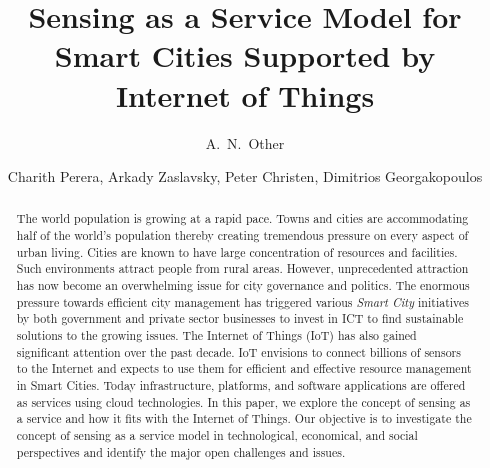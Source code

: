 \documentclass[times]{ettauth}
\begin{document}


\title{Sensing as a Service Model for Smart Cities Supported by Internet of Things}

\author{A.~N.~Other\corrauth}


\author{Charith Perera,
 Arkady Zaslavsky,
Peter Christen,
Dimitrios Georgakopoulos}













\address{Research School of Computer Science, The Australian National University, Canberra, ACT 0200, Australia\\
CSIRO ICT Center, Canberra, ACT 2601, Australia}





\begin{abstract}
The world population is growing at a rapid pace. Towns and cities are accommodating half of the world's population thereby creating tremendous pressure on every aspect of urban living. Cities are known to have large concentration of resources and facilities. Such environments attract people from rural areas. However, unprecedented attraction has now become an overwhelming issue for city governance and politics. The enormous pressure towards efficient city management has triggered various \textit{Smart City} initiatives by both government and private sector businesses to invest in ICT to find sustainable solutions to the growing issues. The Internet of Things (IoT) has also gained significant attention over the past decade. IoT envisions to connect billions of sensors to the Internet and expects to use them for efficient and effective resource management in Smart Cities. Today infrastructure, platforms, and software applications are offered as services using cloud technologies. In this paper, we explore the concept of sensing as a service and how it fits with the Internet of Things.  Our objective is to investigate the concept of sensing as a service model in technological, economical, and social perspectives and identify the major open challenges and issues.
\end{abstract}
\end{document}
